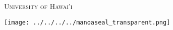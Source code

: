 \documentclass[addpoints, 12pt]{exam}%
\theoremstyle{definition}
\begin{document}
\vspace*{1cm}

\begin{center}
\begin{minipage}{0.29\textwidth}
\begin{Huge}
\textsc{University of Hawai'i}
\end{Huge}
\end{minipage}
\begin{minipage}{0.12\textwidth}
\texttt{[image: ../../../../manoaseal\_transparent.png]}
\end{minipage}
\end{center}


\vspace*{0.5cm}

\newpage
\end{document}
